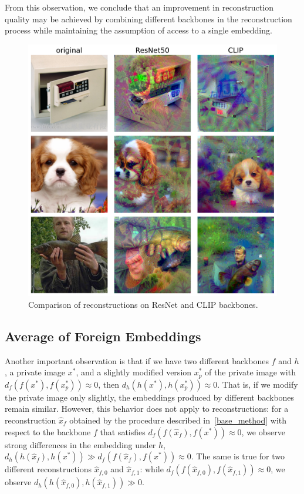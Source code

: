 \documentclass[10pt,twocolumn]{article}
\begin{document}
From this observation, we conclude that an improvement in reconstruction quality may be achieved by combining different backbones in the reconstruction process while maintaining the assumption of access to a single embedding.
\begin{figure}[ht]
    \centering
    \includegraphics[width=\linewidth]{figures/resnet-vs-clip}
    \caption{
        Comparison of reconstructions on ResNet and CLIP backbones.
    }
    \label{fig:resnet_vs_clip}
\end{figure}

\subsection{Average of Foreign Embeddings}
Another important observation is that if we have two different backbones $f$ and $h$, a private image $x^*$, and a slightly modified version $x^*_p$ of the private image with $d_f(f(x^*), f(x^*_p)) \approx 0$, then $d_h(h(x^*), h(x^*_p)) \approx 0$.
That is, if we modify the private image only slightly, the embeddings produced by different backbones remain similar.
However, this behavior does not apply to reconstructions: for a reconstruction $\hat x_f$ obtained by the procedure described in~\ref{base_method} with respect to the backbone $f$ that satisfies $d_f(f(\hat x_f), f(x^*)) \approx 0$, we observe strong differences in the embedding under $h$, $d_h(h(\hat x_f),h(x^*)) \gg d_f(f(\hat x_f),f(x^*))\approx 0$.
The same is true for two different reconstructions $\hat x_{f,0}$ and $\hat x_{f,1}$: while $d_f(f(\hat x_{f,0}), f(\hat x_{f,1}))\approx 0$, we observe $d_h(h(\hat x_{f,0}), h(\hat x_{f,1})) \gg 0$.
\end{document}
